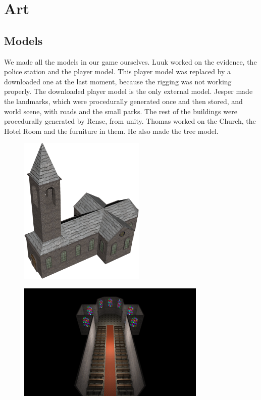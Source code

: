 \documentclass{article}
\begin{document}
\newpage
\section{Art}
\subsection{Models}
We made all the models in our game ourselves. Luuk worked on the evidence, the police station and the player model. This player model was replaced by a downloaded one at the last moment, because the rigging was not working properly. The downloaded player model is the only external model. Jesper made the landmarks, which were procedurally generated once and then stored, and world scene, with roads and the small parks. The rest of the buildings were procedurally generated by Rense, from unity. Thomas worked on the Church, the Hotel Room and the furniture in them. He also made the tree model.

	\begin{figure}[ht!]
		\centering
		\includegraphics[width=60mm]{images/Churchoutside.png}
	\end{figure}

	\begin{figure}[ht!]
		\centering
		\includegraphics[width=90mm]{images/Church.png}
	\end{figure}
\end{document}
